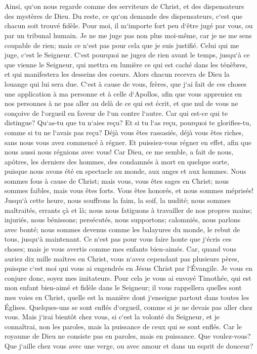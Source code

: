 \chapter{}

\verse Ainsi, qu`on nous regarde comme des serviteurs de Christ, et des dispensateurs des mystères de Dieu. 
\verse Du reste, ce qu`on demande des dispensateurs, c`est que chacun soit trouvé fidèle. 
\verse Pour moi, il m`importe fort peu d`être jugé par vous, ou par un tribunal humain. Je ne me juge pas non plus moi-même, car je ne me sens coupable de rien; 
\verse mais ce n`est pas pour cela que je suis justifié. Celui qui me juge, c`est le Seigneur. 
\verse C`est pourquoi ne jugez de rien avant le temps, jusqu`à ce que vienne le Seigneur, qui mettra en lumière ce qui est caché dans les ténèbres, et qui manifestera les desseins des coeurs. Alors chacun recevra de Dieu la louange qui lui sera due. 
\verse C`est à cause de vous, frères, que j`ai fait de ces choses une application à ma personne et à celle d`Apollos, afin que vous appreniez en nos personnes à ne pas aller au delà de ce qui est écrit, et que nul de vous ne conçoive de l`orgueil en faveur de l`un contre l`autre. 
\verse Car qui est-ce qui te distingue? Qu`as-tu que tu n`aies reçu? Et si tu l`as reçu, pourquoi te glorifies-tu, comme si tu ne l`avais pas reçu? 
\verse Déjà vous êtes rassasiés, déjà vous êtes riches, sans nous vous avez commencé à régner. Et puissiez-vous régner en effet, afin que nous aussi nous régnions avec vous! 
\verse Car Dieu, ce me semble, a fait de nous, apôtres, les derniers des hommes, des condamnés à mort en quelque sorte, puisque nous avons été en spectacle au monde, aux anges et aux hommes. 
\verse Nous sommes fous à cause de Christ; mais vous, vous êtes sages en Christ; nous sommes faibles, mais vous êtes forts. Vous êtes honorés, et nous sommes méprisés! 
\verse Jusqu`à cette heure, nous souffrons la faim, la soif, la nudité; nous sommes maltraités, errants çà et là; 
\verse nous nous fatiguons à travailler de nos propres mains; injuriés, nous bénissons; persécutés, nous supportons; 
\verse calomniés, nous parlons avec bonté; nous sommes devenus comme les balayures du monde, le rebut de tous, jusqu`à maintenant. 
\verse Ce n`est pas pour vous faire honte que j`écris ces choses; mais je vous avertis comme mes enfants bien-aimés. 
\verse Car, quand vous auriez dix mille maîtres en Christ, vous n`avez cependant pas plusieurs pères, puisque c`est moi qui vous ai engendrés en Jésus Christ par l`Évangile. 
\verse Je vous en conjure donc, soyez mes imitateurs. 
\verse Pour cela je vous ai envoyé Timothée, qui est mon enfant bien-aimé et fidèle dans le Seigneur; il vous rappellera quelles sont mes voies en Christ, quelle est la manière dont j`enseigne partout dans toutes les Églises. 
\verse Quelques-uns se sont enflés d`orgueil, comme si je ne devais pas aller chez vous. 
\verse Mais j`irai bientôt chez vous, si c`est la volonté du Seigneur, et je connaîtrai, non les paroles, mais la puissance de ceux qui se sont enflés. 
\verse Car le royaume de Dieu ne consiste pas en paroles, mais en puissance. 
\verse Que voulez-vous? Que j`aille chez vous avec une verge, ou avec amour et dans un esprit de douceur? 


